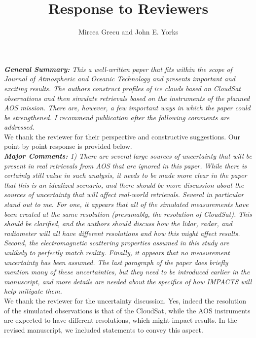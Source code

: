 \documentclass[12pt]{article}
\author{Mircea Grecu and John E. Yorks}
\title{Response to Reviewers}
\date{}
\begin{document}
\maketitle

\noindent
\textit{ \textbf{General Summary:}
This a well-written paper that fits within the scope of Journal of Atmospheric and 
Oceanic Technology and presents important and exciting results. The authors construct
 profiles of ice clouds based on CloudSat observations and then simulate retrievals 
 based on the instruments of the planned AOS mission. There are, however, 
 a few important ways in which the paper could be strengthened. I recommend 
 publication after the following comments are addressed.}\\
\newline
 We thank the reviewer for their perspective and constructive suggestions. Our point by point response is 
 provided below.\\
\newline
\textit{\textbf{Major Comments:} 1) There are several large sources of uncertainty that will be present in real 
retrievals from AOS that are ignored in this paper. While there is certainly still 
value in such analysis, it needs to be made more clear in the paper that this is an 
idealized scenario, and there should be more discussion about the sources of 
uncertainty that will affect real-world retrievals. Several in particular stand 
out to me. For one, it appears that all of the simulated measurements have been 
created at the same resolution (presumably, the resolution of CloudSat). This
should be clarified, and the authors should discuss how the lidar, radar, and 
radiometer will all have different resolutions and how this might affect results. 
Second, the electromagnetic scattering properties assumed in this study are 
unlikely to perfectly match reality. Finally, it appears that no measurement 
uncertainty has been assumed. The last paragraph of the paper does briefly mention 
many of these uncertainties, but they need to be introduced earlier in the 
manuscript, and more details are needed about the specifics of how IMPACTS
will help mitigate them.}\\
\newline
We thank the reviewer for the uncertainty discussion. Yes, indeed the resolution of the simulated 
observations is that of the CloudSat, while the AOS instruments are expected to have different resolutions,
which might impact results. In the revised manuscript, we included statements to convey this aspect.
\end{document}
